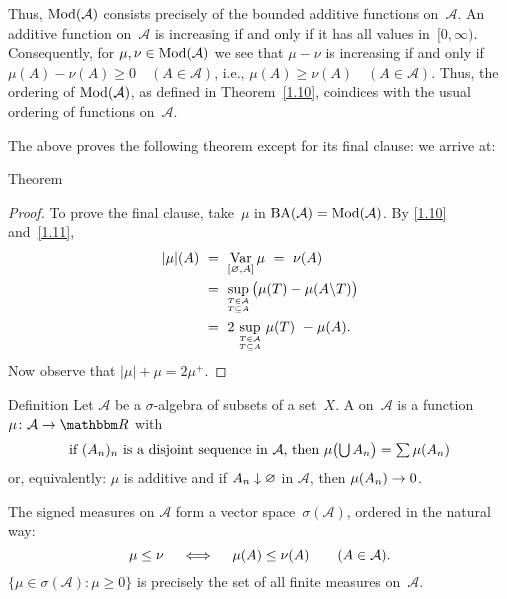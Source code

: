 \documentclass[main.tex]{subfiles}
\begin{document}
Thus, $\mathrm{Mod}(\mathcal A)$ consists precisely of
the bounded additive functions on~$\mathcal A$.
An additive function on~$\mathcal A$ is increasing
if and only if it has all values in~$[0,\infty)$.
Consequently,
for $\mu,\nu\in\mathrm{Mod}(\mathcal A)$
we see that $\mu-\nu$ is increasing if and only
if $\mu(A)-\nu(A)\geq 0\quad(A\in\mathcal A)$,
i.e., $\mu(A)\geq\nu(A)\quad(A\in\mathcal A)$.
Thus, the ordering of $\mathrm{Mod}(\mathcal A)$,
as defined in Theorem~\ref{1.10},
coindices with the usual ordering of functions on~$\mathcal A$.

The above proves the following theorem
except for its final clause:
we arrive at:
\begin{psec}{1.12}{Theorem}

\end{psec}
\begin{proof}
To prove the final clause,
take~$\mu$ in $\mathrm{BA}(\mathcal A)=\mathrm{Mod}(\mathcal A)$.
By \ref{1.10} and~\ref{1.11},
\begin{align*}
|\mu|(A)\ &=\ \mathop{\mathrm{Var}}_{[\varnothing,A]}\mu\ =\ \nu(A) \\
  &=\ \sup_{\substack{
       \scriptscriptstyle T\in\mathcal A \\
       \scriptscriptstyle T\subseteq A}}\,
    \bigl( \mu(T)-\mu(A\backslash T)\bigr) \\
  &=\ 2 \, \sup_{\substack{
       \scriptscriptstyle T\in\mathcal A \\
       \scriptscriptstyle T\subseteq A}}\,\mu(T) \ -\mu(A)\text{.}
\end{align*}
Now observe that $|\mu|+\mu = 2\mu^+$. \xqed
\end{proof}
%
%
\begin{psec}{1.13}{Definition}
Let $\mathcal A$ be a $\sigma$-algebra 
of subsets of a set~$X$.
A  on~$\mathcal A$
is a function~$\mu\colon\mathcal A \ra \R$ with
\begin{equation*}
\textstyle{\ensuremath{\text{if }}(A_n)_n\ensuremath{\text{ is a disjoint sequence in }}\mathcal{A}
\ensuremath{\text{, then }}\mu\bigl(\bigcup A_n\bigr)=\sum\mu(A_n)}
\end{equation*}
or, equivalently: 
$\mu$ is additive
and if $A_n\downarrow \varnothing$ in $\mathcal A$,
then $\mu(A_n)\rightarrow 0$.

The signed measures on $\mathcal A$ form 
a vector space~$\sigma(\mathcal A)$,
ordered in the natural way:
\begin{equation*}
\mu \leq \nu 
  \quad \iff \quad
  \mu(A)\leq\nu(A)\qquad (A\in\mathcal A)
\text{.}
\end{equation*}
$\{ \mu\in \sigma(\mathcal A)\colon \mu \ge 0\}$
is precisely the set of all finite measures on~$\mathcal A$.
\end{psec}
\end{document}
